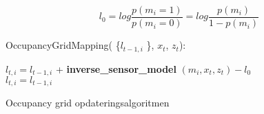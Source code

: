 \[ l_0 =  log \frac{p(m_i = 1)}{p(m_i = 0)} = log \frac{p(m_i)}{1- p(m_i)} \]

\begin{algorithm}[H]
\LinesNumbered
OccupancyGridMapping( \{$ l_{t-1,i} $ \}, $ x_t $, $ z_t $):

{
{ $ l_{t,i} = l_{t-1,i} $ + \textbf{inverse\_sensor\_model} $( m_i, x_t, z_t ) - l_0$\\ }
{ $ l_{t,i} = l_{t-1,i}  $\\ }
}
\caption{Occupancy grid opdateringsalgoritmen}\label{occupancygrid:alg}
\end{algorithm}




